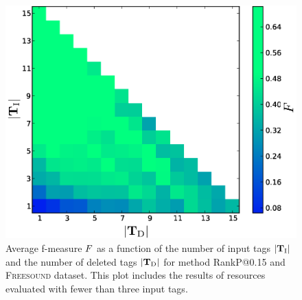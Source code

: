 \begin{table} \footnotesize
{}
  \begin{center}
    \caption[Average precision, recall and f-measure for the best scoring methods without filtering the number of input tags]{Average precision $\precision$, recall $\recall$ and f-measure $\fmeasure$ for the best scoring methods in \textsc{Freesound} and \textsc{Flickr1M} without filtering the number of input tags. Results are sorted in descending $\fmeasure$. }
    \label{tab:results_no_filt}
  \end{center}
\end{table}

\begin{figure}
  \centering
  \includegraphics[width=\figSizeMid]{ch03_general/pics/09_fmeasure_percentage.pdf} 
  \caption[Average f-measure as a function of  the number of input tags and the number of deleted tags]{
  Average f-measure $\fmeasure$ as a function of  the number of input tags $|\mathbf{T}_{\text{I}}|$ and the number of deleted tags $|\mathbf{T}_{\text{D}}|$ for method  RankP@0.15 and \textsc{Freesound} dataset. This plot includes the results of resources evaluated with fewer than three input tags.}
  \label{general:fig:3d}
\end{figure}


